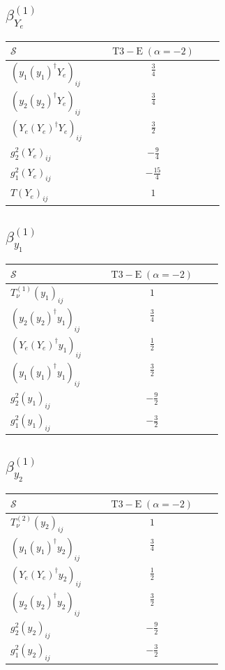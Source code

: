 \documentclass[9pt]{article}
\begin{document}
\subsection*{$ \beta_{Y_e}^{(1)} $}
\begin{longtable}{@{}p{0.38\linewidth}c@{}}
\toprule
$\mathcal{S}$ & $ \mathrm{T3-E}\;(\alpha=-2) $ \\
\midrule
$ (y_1 (y_1)^{\dagger} Y_e)_{ij} $ & $ \frac{3}{4} $ \\
$ (y_2 (y_2)^{\dagger} Y_e)_{ij} $ & $ \frac{3}{4} $ \\
$ (Y_e (Y_e)^{\dagger} Y_e)_{ij} $ & $ \frac{3}{2} $ \\
$ g_2^2 (Y_e)_{ij} $ & $ - \frac{9}{4} $ \\
$ g_1^2 (Y_e)_{ij} $ & $ - \frac{15}{4} $ \\
$ T (Y_e)_{ij} $ & $ 1 $ \\
\bottomrule
\end{longtable}
\subsection*{$ \beta_{y_1}^{(1)} $}
\begin{longtable}{@{}p{0.38\linewidth}c@{}}
\toprule
$\mathcal{S}$ & $ \mathrm{T3-E}\;(\alpha=-2) $ \\
\midrule
$ T_{\nu}^{(1)} (y_1)_{ij} $ & $ 1 $ \\
$ (y_2 (y_2)^{\dagger} y_1)_{ij} $ & $ \frac{3}{4} $ \\
$ (Y_e (Y_e)^{\dagger} y_1)_{ij} $ & $ \frac{1}{2} $ \\
$ (y_1 (y_1)^{\dagger} y_1)_{ij} $ & $ \frac{3}{2} $ \\
$ g_2^2 (y_1)_{ij} $ & $ - \frac{9}{2} $ \\
$ g_1^2 (y_1)_{ij} $ & $ - \frac{3}{2} $ \\
\bottomrule
\end{longtable}
\subsection*{$ \beta_{y_2}^{(1)} $}
\begin{longtable}{@{}p{0.38\linewidth}c@{}}
\toprule
$\mathcal{S}$ & $ \mathrm{T3-E}\;(\alpha=-2) $ \\
\midrule
$ T_{\nu}^{(2)} (y_2)_{ij} $ & $ 1 $ \\
$ (y_1 (y_1)^{\dagger} y_2)_{ij} $ & $ \frac{3}{4} $ \\
$ (Y_e (Y_e)^{\dagger} y_2)_{ij} $ & $ \frac{1}{2} $ \\
$ (y_2 (y_2)^{\dagger} y_2)_{ij} $ & $ \frac{3}{2} $ \\
$ g_2^2 (y_2)_{ij} $ & $ - \frac{9}{2} $ \\
$ g_1^2 (y_2)_{ij} $ & $ - \frac{3}{2} $ \\
\bottomrule
\end{longtable}
\end{document}
